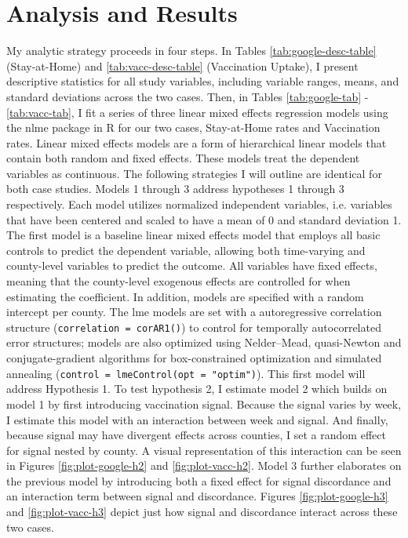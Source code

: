 \hypertarget{analysis-and-results}{%
\section{Analysis and Results}\label{analysis-and-results}}

My analytic strategy proceeds in four steps. In Tables
\ref{tab:google-desc-table} (Stay-at-Home) and \ref{tab:vacc-desc-table}
(Vaccination Uptake), I present descriptive statistics for all study variables,
including variable ranges, means, and standard deviations across the two cases.
Then, in Tables \ref{tab:google-tab} - \ref{tab:vacc-tab}, I fit a series of
three linear mixed effects regression models using the nlme package in R
\citep{pinheiro_etal21, pinheiro_bates00} for our two cases, Stay-at-Home rates and
Vaccination rates. Linear mixed effects models are a form of hierarchical linear
models that contain both random and fixed effects. These models treat the
dependent variables as continuous. The following strategies I will outline are
identical for both case studies. Models 1 through 3 address hypotheses 1 through
3 respectively. Each model utilizes normalized independent variables, i.e.
variables that have been centered and scaled to have a mean of 0 and standard
deviation 1. The first model is a baseline linear mixed effects model that
employs all basic controls to predict the dependent variable, allowing both
time-varying and county-level variables to predict the outcome. All variables
have fixed effects, meaning that the county-level exogenous effects are
controlled for when estimating the coefficient. In addition, models are
specified with a random intercept per county. The lme models are set with a
autoregressive correlation structure (\texttt{correlation\ =\ corAR1()}) to control for
temporally autocorrelated error structures; models are also optimized using
Nelder--Mead, quasi-Newton and conjugate-gradient algorithms for box-constrained
optimization and simulated annealing (\texttt{control\ =\ lmeControl(opt\ =\ "optim")}).
This first model will address Hypothesis 1. To test hypothesis 2, I estimate
model 2 which builds on model 1 by first introducing vaccination signal. Because
the signal varies by week, I estimate this model with an interaction between
week and signal. And finally, because signal may have divergent effects across
counties, I set a random effect for signal nested by county. A visual
representation of this interaction can be seen in Figures
\ref{fig:plot-google-h2} and \ref{fig:plot-vacc-h2}. Model 3 further
elaborates on the previous model by introducing both a fixed effect for signal
discordance and an interaction term between signal and discordance. Figures
\ref{fig:plot-google-h3} and \ref{fig:plot-vacc-h3} depict just how signal and
discordance interact across these two cases.

